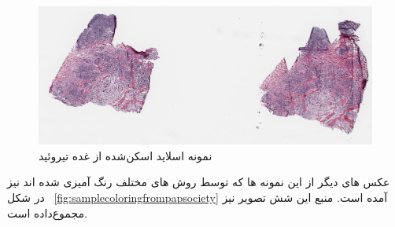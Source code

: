 \begin{figure}
    \begin{center}
        \includegraphics[width=\linewidth]{figs/basic_concepts/subs/Sample Slide From NCI.PNG}
    \end{center}
    \caption{نمونه اسلاید اسکن‌شده از غده تیروئید}
    \label{fig:sampleWSIscan}
\end{figure}
عکس های دیگر از این نمونه ها که توسط روش های مختلف رنگ آمیزی شده اند نیز در شکل ~\autoref{fig:samplecoloringfrompapsociety} آمده است.
منبع این شش تصویر نیز مجموع‌داده \cite{papsocietyiamgeatlas} است.
